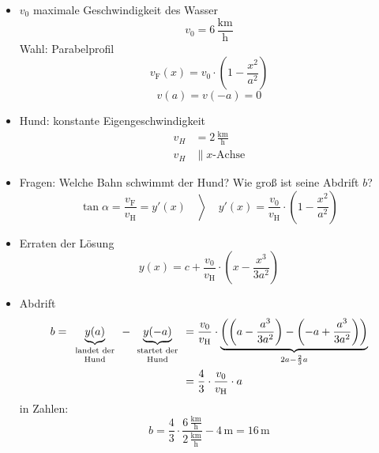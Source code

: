 \begin{example}
  \begin{itemize}
    \begingroup
    \newcommand{\kmh}{\ensuremath{\,\textstyle \frac{\text{km}}{\text{h}}}}
    \item $v_0$ maximale Geschwindigkeit des Wasser
      \begin{equation*} v_0 = 6 \kmh \end{equation*}
      Wahl: Parabelprofil
      \begin{equation*} v_\text{F}(x) = v_0 \cdot \left( 1 - \frac{x^2}{a^2} \right) \end{equation*}
      \begin{equation*} v(a) = v(-a) = 0 \end{equation*}
    \item Hund: konstante Eigengeschwindigkeit
      \begin{align*}
        v_H &= 2 \kmh \\
        v_H &\parallel \text{$x$-Achse}
      \end{align*}
    \item Fragen: Welche Bahn schwimmt der Hund? Wie groß ist seine Abdrift $b$?
      \begin{equation*} \left. \tan \alpha = \frac{v_\text{F}}{v_\text{H}} = y'(x) \quad\right\rangle\quad y'(x) = \frac{v_0}{v_\text{H}} \cdot \left( 1 - \frac{x^2}{a^2}\right)\end{equation*}
    \item Erraten der Lösung
      \begin{equation*}
      y(x) = c + \frac{v_0}{v_\text{H}} \cdot \left( x - \frac{x^3}{3a^2}\right)
      \end{equation*}
    \item Abdrift
      \begin{align*}
        b = \underbrace{y(a)}_{\parbox{16mm}{\centering\scriptsize landet der Hund}} -\underbrace{y(-a)}_{\parbox{16mm}{\centering\scriptsize startet der Hund}} &= \ds\frac{v_0}{v_\text{H}} \cdot \underbrace{\left( \left( a - \frac{a^3}{3a^2}\right) - \left( -a + \frac{a^3}{3a^2}\right) \right)}_{2a - \frac 2 3 a} \\
        &= \ds\frac 4 3 \cdot \frac{v_0}{v_\text{H}}\cdot  a
      \end{align*}
      in Zahlen:
      \begin{equation*}
        b = \frac 4 3 \cdot \frac {6 \kmh}{2 \kmh} - 4 \,\text{m} = 16 \,\text{m}
      \end{equation*}
    \endgroup
  \end{itemize}
\end{example}

